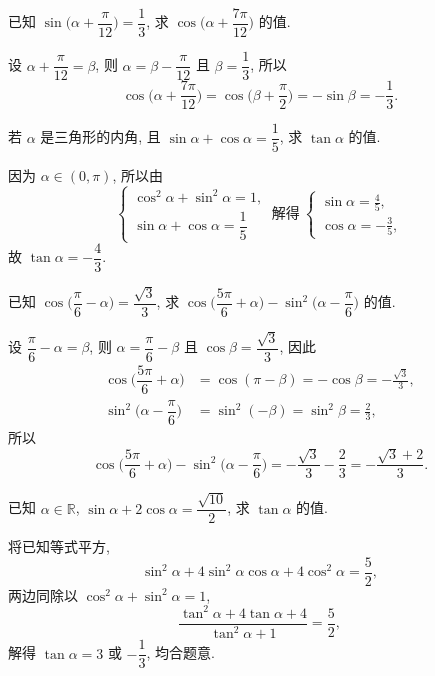 \begin{exercise}
    已知 $\sin\biggl(\alpha+\dfrac\pi{12}\biggr)= \dfrac13$, 
    求 $\cos\biggl(\alpha+ \dfrac{7\pi}{12}\biggr)$ 的值.
\end{exercise}
\beginsolution
    设 $\alpha+\dfrac\pi{12}= \beta$, 则 $\alpha= \beta-\dfrac\pi{12}$ 且 $\beta= \dfrac13$, 所以
    \[\cos\biggl(\alpha+ \dfrac{7\pi}{12}\biggr)
        = \cos\biggl(\beta+\frac\pi2\biggr)
        = -\sin\beta= -\frac13.\]
\endsolution

\begin{exercise}
    若 $\alpha$ 是三角形的内角, 且 $\sin\alpha +\cos\alpha = \dfrac15$, 
    求 $\tan\alpha $ 的值.
\end{exercise}
\beginsolution
    因为 $\alpha\in(0,\pi)$, 所以由
    \[\left\{\!\!\begin{array}{l}
        \cos^2\alpha+\sin^2\alpha=1,\\
        \sin\alpha +\cos\alpha = \dfrac15
    \end{array}\right.\ \text{解得}\ 
    \left\{\!\!\begin{array}{l}
        \sin\alpha= \frac45,\\
        \cos\alpha= -\frac35,
    \end{array}\right.\]
    故 $\tan\alpha= -\dfrac43$.
\endsolution

\begin{exercise}
    已知 $\cos\biggl(\dfrac{\pi}6- \alpha\biggr)= \dfrac{\sqrt3}3$, 求 $\cos\biggl(\dfrac{5\pi}6+\alpha\biggr)- 
      \sin^2\biggl(\alpha-\dfrac{\pi}6\biggr)$ 的值.
\end{exercise}
\beginsolution
    设 $\dfrac{\pi}6- \alpha= \beta$, 则 $\alpha= \dfrac{\pi}6-\beta$ 且 $\cos\beta= \dfrac{\sqrt3}3$, 因此
    \[\begin{aligned}
        \cos\biggl(\dfrac{5\pi}6+\alpha\biggr)
        &= \cos(\pi-\beta)= -\cos\beta
         = -\frac{\sqrt3}{3},\\ 
        \sin^2\biggl(\alpha-\dfrac{\pi}6\biggr)
        &= \sin^2(-\beta)= \sin^2\beta= \frac23,
    \end{aligned}\]
    所以
    \[\cos\biggl(\dfrac{5\pi}6+\alpha\biggr)- 
    \sin^2\biggl(\alpha-\dfrac{\pi}6\biggr)
        = -\frac{\sqrt3}{3}- \frac23
        = -\frac{\sqrt3+2}{3}.\]
\endsolution

\begin{exercise}
    已知 $\alpha\in\mathbb{R}$, $\sin\alpha +2\cos\alpha =
      \dfrac{\sqrt{10}}2$, 求 $\tan\alpha $ 的值.
\end{exercise}
\beginsolution
    将已知等式平方,
    \[\sin^2\alpha +4\sin^2\alpha\cos\alpha + 4\cos^2\alpha
        = \dfrac52,\]
    两边同除以 $\cos^2\alpha+\sin^2\alpha=1$,
    \[\frac{\tan^2\alpha+4\tan\alpha+4}{\tan^2\alpha+1}
        = \frac52,\]
    解得 $\tan\alpha= 3$ 或 $-\dfrac13$, 均合题意.
\endsolution


